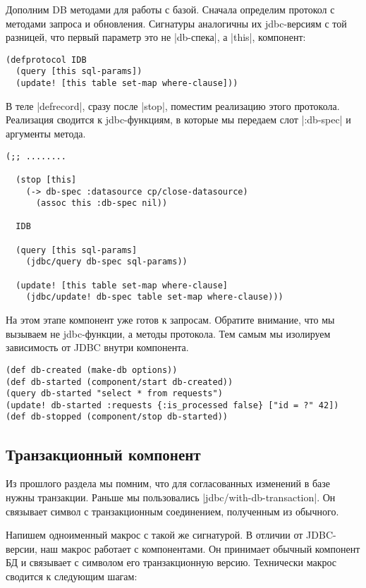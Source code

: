 Дополним DB методами для работы с базой. Сначала определим протокол с методами
запроса и обновления. Сигнатуры аналогичны их jdbc-версиям с той разницей, что
первый параметр это не \spverb|db-спека|, а \spverb|this|, компонент:

\begin{verbatim}
(defprotocol IDB
  (query [this sql-params])
  (update! [this table set-map where-clause]))
\end{verbatim}

В теле \spverb|defrecord|, сразу после \spverb|stop|, поместим реализацию этого
протокола. Реализация сводится к jdbc-функциям, в которые мы передаем слот
\spverb|:db-spec| и аргументы метода.

\begin{verbatim}
(;; ........

  (stop [this]
    (-> db-spec :datasource cp/close-datasource)
      (assoc this :db-spec nil))

  IDB

  (query [this sql-params]
    (jdbc/query db-spec sql-params))

  (update! [this table set-map where-clause]
    (jdbc/update! db-spec table set-map where-clause)))
\end{verbatim}

На этом этапе компонент уже готов к запросам. Обратите внимание, что мы вызываем
не jdbc-функции, а методы протокола. Тем самым мы изолируем зависимость от JDBC
внутри компонента.

\begin{verbatim}
(def db-created (make-db options))
(def db-started (component/start db-created))
(query db-started "select * from requests")
(update! db-started :requests {:is_processed false} ["id = ?" 42])
(def db-stopped (component/stop db-started))
\end{verbatim}

\subsection{Транзакционный компонент}

Из прошлого раздела мы помним, что для согласованных изменений в базе нужны
транзакции. Раньше мы пользовались \spverb|jdbc/with-db-transaction|. Он связывает
символ с транзакционным соединением, полученным из обычного.

Напишем одноименный макрос с такой же сигнатурой. В отличии от JDBC-версии, наш
макрос работает с компонентами. Он принимает обычный компонент БД и связывает с
символом его транзакционную версию. Технически макрос сводится к следующим
шагам:

